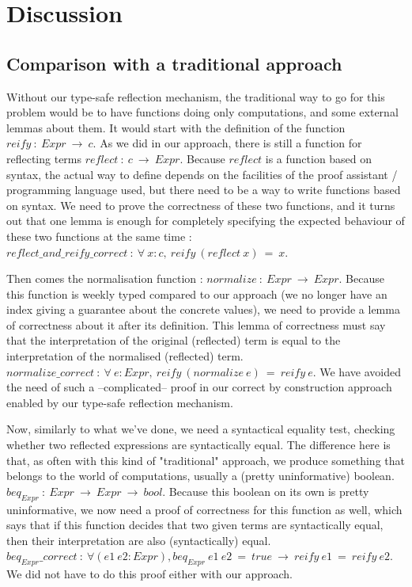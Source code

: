 \section {Discussion}


	\subsection{Comparison with a traditional approach}

Without our type-safe reflection mechanism, the traditional way to go for this problem would be to have functions doing only computations, and some external lemmas about them. It would start with the definition of the function $reify\ :\ Expr\ \rightarrow\ c$. As we did in our approach, there is still a function for reflecting terms $reflect\ :\ c\ \rightarrow\ Expr$. Because $reflect$ is a function based on syntax,  the actual way to define depends on the facilities of the proof assistant / programming language used, but there need to be a way to write functions based on syntax. We need to prove the correctness of these two functions, and it turns out that one lemma is enough for completely specifying the expected behaviour of these two functions at the same time : $reflect\_and\_reify\_correct\ :\ \forall\ x:c,\ reify\ (reflect\ x)\ =\ x$.

Then comes the normalisation function : $normalize\ :\ Expr\ \rightarrow\ Expr$. Because this function is weekly typed compared to our approach (we no longer have an index giving a guarantee about the concrete values), we need to provide a lemma of correctness about it after its definition. This lemma of correctness must say that the interpretation of the original (reflected) term is equal to the interpretation of the normalised (reflected) term. $normalize\_correct\ :\ \forall\ e:Expr,\ reify\ (normalize\ e)\ =\ reify\ e$. We have avoided the need of such a --complicated-- proof in our correct by construction approach enabled by our type-safe reflection mechanism.

Now, similarly to what we've done, we need a syntactical equality test, checking whether two reflected expressions are syntactically equal. The difference here is that, as often with this kind of "traditional" approach, we produce something that belongs to the world of computations, usually a (pretty uninformative) boolean.
$beq_{Expr}\ :\ Expr\ \rightarrow\ Expr\ \rightarrow\ bool$. Because this boolean on its own is pretty uninformative, we now need a proof of correctness for this function as well, which says that if this function decides that two given terms are syntactically equal, then their interpretation are also (syntactically) equal. $beq_{Expr}\_correct\ :\ \forall (e1\ e2:Expr), beq_{Expr}\ e1\ e2\ =\ true\ \rightarrow\ reify\ e1\ =\ reify\ e2$. We did not have to do this proof either with our approach.

